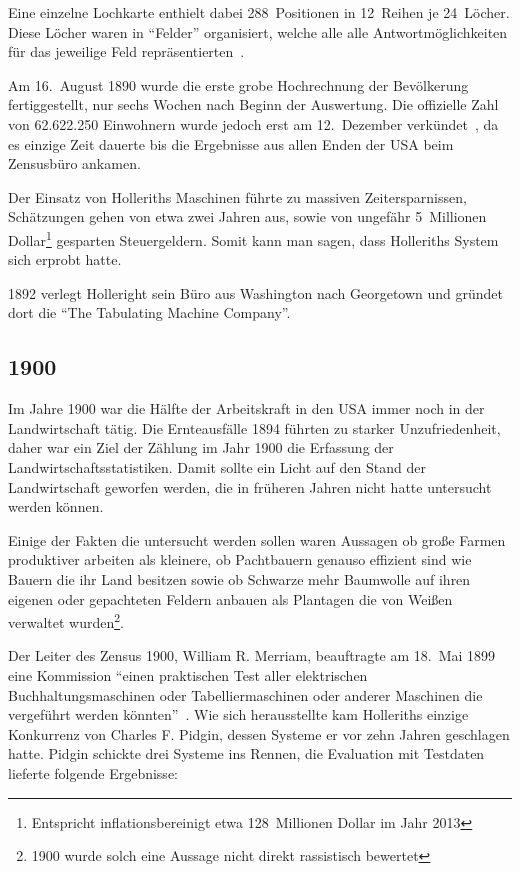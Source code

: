 \documentclass[parskip=half]{scrartcl}
\begin{document}
Eine einzelne Lochkarte enthielt dabei 288~Positionen in 12~Reihen je
24~Löcher. Diese Löcher waren in \enquote{Felder} organisiert, welche alle alle
Antwortmöglichkeiten für das jeweilige Feld
repräsentierten~\cite{priestley2010science}.

Am 16.~August 1890 wurde die erste grobe Hochrechnung der Bevölkerung
fertiggestellt, nur sechs Wochen nach Beginn der Auswertung. Die offizielle
Zahl von 62.622.250 Einwohnern wurde jedoch erst am 12.~Dezember
verkündet~\cite{austrian1982herman}, da es einzige Zeit dauerte bis die
Ergebnisse aus allen Enden der USA beim Zensusbüro ankamen.

Der Einsatz von Holleriths Maschinen führte zu massiven Zeitersparnissen,
Schätzungen gehen von etwa zwei Jahren aus, sowie von ungefähr 5~Millionen
Dollar\footnote{Entspricht inflationsbereinigt etwa 128~Millionen Dollar im
Jahr 2013} gesparten Steuergeldern. Somit kann man sagen, dass Holleriths
System sich erprobt hatte.

1892 verlegt Holleright sein Büro aus Washington nach Georgetown und gründet
dort die \enquote{The Tabulating Machine Company}.


\subsection{1900}
\label{sec:1900}

Im Jahre 1900 war die Hälfte der Arbeitskraft in den USA immer noch in der
Landwirtschaft tätig. Die Ernteausfälle 1894 führten zu starker
Unzufriedenheit, daher war ein Ziel der Zählung im Jahr 1900 die Erfassung der
Landwirtschaftsstatistiken. Damit sollte ein Licht auf den Stand der
Landwirtschaft geworfen werden, die in früheren Jahren nicht hatte untersucht
werden können.

Einige der Fakten die untersucht werden sollen waren Aussagen ob große Farmen
produktiver arbeiten als kleinere, ob Pachtbauern genauso effizient sind wie
Bauern die ihr Land besitzen sowie ob Schwarze mehr Baumwolle auf ihren eigenen
oder gepachteten Feldern anbauen als Plantagen die von Weißen verwaltet
wurden\footnote{1900 wurde solch eine Aussage nicht direkt rassistisch
bewertet}.

Der Leiter des Zensus 1900, William R. Merriam, beauftragte am 18.~Mai 1899
eine Kommission \enquote{einen praktischen Test aller elektrischen
Buchhaltungsmaschinen oder Tabelliermaschinen oder anderer Maschinen die
vergeführt werden könnten}~\cite{austrian1982herman}. Wie sich herausstellte
kam Holleriths einzige Konkurrenz von Charles F. Pidgin, dessen Systeme er vor
zehn Jahren geschlagen hatte. Pidgin schickte drei Systeme ins Rennen, die
Evaluation mit Testdaten lieferte folgende Ergebnisse:
\end{document}
